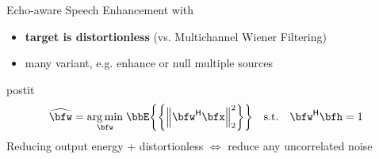 \begin{frame}[t]{Echo-aware Speech Enhancement with \dechorate}
    \pause
    \begin{itemize}
        \small
        \item \textbf{target is distortionless} (vs. Multichannel Wiener Filtering)
        \item many variant, e.g. enhance or null multiple sources~\cite{gannot2017consolidated}
    \end{itemize}

    \pause
    \vfill
    \vspace*{.25em}
    \begin{beamercolorbox}[sep=.5em]{postit}
        \centering
        \begin{equation*}
            \widehat{\bfw} = \underset{\bfw}{\arg\min} \;
            \bbE\kbrace{\set{ \kvvbar{\khermitian{\bfw} \bfx }_2^2}}
            \quad\text{s.t.}\quad\khermitian{\bfw}\bfh = 1
        \end{equation*}
        \textcolor{myred}{\small Reducing output energy + distortionless $\Leftrightarrow$ reduce any uncorrelated noise}
    \end{beamercolorbox}

\end{frame}

